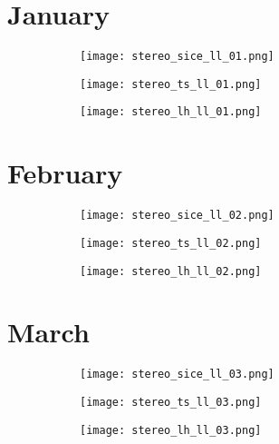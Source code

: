 \documentclass[preview]{standalone}
\begin{document}
\section*{January}
\begin{figure}
  \begin{subfigure}[t]{0.329\textwidth}
    \texttt{[image: stereo\_sice\_ll\_01.png]}
  \end{subfigure}
  \begin{subfigure}[t]{0.329\textwidth}
    \texttt{[image: stereo\_ts\_ll\_01.png]}
  \end{subfigure}
  \begin{subfigure}[t]{0.329\textwidth}
    \texttt{[image: stereo\_lh\_ll\_01.png]}
  \end{subfigure}
\end{figure}

\section*{February}
\begin{figure}
  \begin{subfigure}[t]{0.329\textwidth}
    \texttt{[image: stereo\_sice\_ll\_02.png]}
  \end{subfigure}
  \begin{subfigure}[t]{0.329\textwidth}
    \texttt{[image: stereo\_ts\_ll\_02.png]}
  \end{subfigure}
  \begin{subfigure}[t]{0.329\textwidth}
    \texttt{[image: stereo\_lh\_ll\_02.png]}
  \end{subfigure}
\end{figure}

\section*{March}
\begin{figure}
  \begin{subfigure}[t]{0.329\textwidth}
    \texttt{[image: stereo\_sice\_ll\_03.png]}
  \end{subfigure}
  \begin{subfigure}[t]{0.329\textwidth}
    \texttt{[image: stereo\_ts\_ll\_03.png]}
  \end{subfigure}
  \begin{subfigure}[t]{0.329\textwidth}
    \texttt{[image: stereo\_lh\_ll\_03.png]}
  \end{subfigure}
\end{figure}
\end{document}
